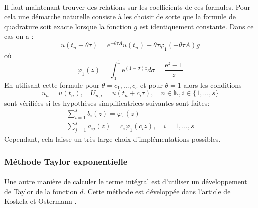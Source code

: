         \paragraph{}
        Il faut maintenant trouver des relations sur les coefficients de ces formules. Pour cela une démarche naturelle consiste à les choisir de sorte que la formule de quadrature soit exacte lorsque la fonction $g$ est identiquement constante. Dans ce cas on a :
        \begin{equation} 
            u\left(t_{n}+\theta \tau\right)=e^{-\theta \tau A} u\left(t_{n}\right)+\theta \tau \varphi_{1}(-\theta \tau A) g
        \end{equation}
        où
        \begin{equation} 
            \varphi_{1}(z)=\int_{0}^{1} \mathrm{e}^{(1-\sigma) z} d \sigma=\frac{\mathrm{e}^{z}-1}{z}
        \end{equation}
        En utilisant cette formule pour $\theta = c_1,...,c_s$ et pour $\theta = 1$ alors les conditions
        $$
        u_n = u(t_n),\quad U_{n,i} = u(t_n+c_i \tau), \quad n\in \mathbb{N}, i\in\{1,...,s\}
        $$
        sont vérifiées si les hypothèses simplificatrices suivantes sont faites:
        \begin{equation} 
            \begin{array}{l}{\sum_{i=1}^{s} b_{i}(z)=\varphi_{1}(z)} \\ {\sum_{j=1}^{s} a_{i j}(z)=c_{i} \varphi_{1}\left(c_{i} z\right), \quad i=1, \ldots, s}\end{array}
        \end{equation}
        Cependant, cela laisse un très large choix d'implémentations possibles.


    \subsubsection{Méthode Taylor exponentielle}
        \paragraph{}
        Une autre manière de calculer le terme intégral est d'utiliser un développement de Taylor de la fonction $d$. Cette méthode est développée dans l'article de Koskela et Ostermann \cite{Taylor}.

